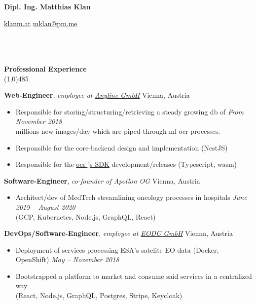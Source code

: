 \documentclass[9pt]{extarticle}
\newcommand\negativespace[1][-0.12cm]{\hspace*{#1}}
\begin{document}
\centerline{{\LARGE \bf Dipl. Ing. Matthias Klan}}
\centerline{\small \href{https://klanm.at}{klanm.at} \raisebox{0.25ex}{\tiny$\bullet$}  \href{mailto:mklan@pm.me}{mklan@pm.me}}


\noindent %
\\\\\\
\vspace*{-6pt}
{\negativespace \Large \bf Professional Experience}\\
\line(1,0){485}
\\
\noindent

\noindent
{\bf Web-Engineer}, \textit{employee at \href{https://anyline.com}{Anyline GmbH}}  \hfill Vienna, Austria 
\begin{itemize}
\setlength\itemsep{0.05em}
\item Responsible for storing/structuring/retrieving a steady growing db of  \hfill \textit{From November 2018} \\ 
millions new images/day which are piped through ml ocr processes.
\item Responsible for the core-backend design and implementation (NestJS)
\item Responsible for the \href{https://github.com/Anyline/anyline-ocr-anylinejs-module}{ocr js SDK} development/releases (Typescript, wasm) \\
\end{itemize}

\noindent
{\bf Software-Engineer}, \textit{co-founder of Apollon OG}  \hfill Vienna, Austria
\begin{itemize}
\setlength\itemsep{0.05em}
\item Architect/dev of MedTech streamlining oncology processes in hospitals \hfill \textit{June 2019 -- August 2020} \\
(GCP, Kubernetes, Node.js, GraphQL, React) \\
\end{itemize}

\noindent
{\bf DevOps/Software-Engineer}, \textit{employee at \href{https://eodc.eu}{EODC GmbH}}  \hfill Vienna, Austria
\begin{itemize}
\setlength\itemsep{0.05em}
    \item Deployment of services processing ESA's satelite EO data (Docker, OpenShift) \hfill \textit{May -- November 2018}
    \item Bootstrapped a platform to market and consume said services in a centralized way \\
    (React, Node.js, GraphQL, Postgres, Stripe, Keycloak) \\
\end{itemize}
\end{document}
